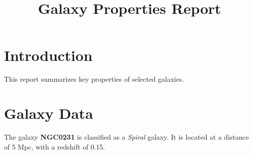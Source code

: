 \documentclass{article}
\title{Galaxy Properties Report}
\author{}
\date{}
\begin{document}
\maketitle

\section{Introduction}
This report summarizes key properties of selected galaxies.

\section{Galaxy Data}
The galaxy \textbf{NGC0231} is classified as a \textit{Spiral} galaxy. 
It is located at a distance of 5 Mpc, with a redshift of 0.15.
\end{document}
